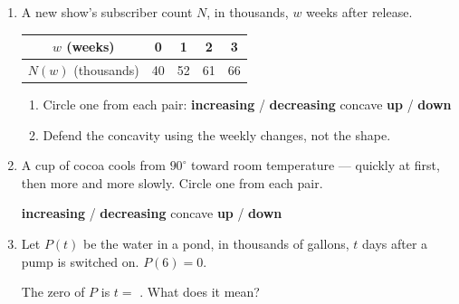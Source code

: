 \documentclass[10pt]{article}
\begin{document}

\vspace{0.12in}

\begin{enumerate}[itemsep=12pt]

\item A new show's subscriber count $N$, in thousands, $w$ weeks after release.

\smallskip
\renewcommand{\arraystretch}{1.4}
\begin{tabular}{|c|c|c|c|c|}
\hline
$w$ (weeks) & 0 & 1 & 2 & 3 \\
\hline
$N(w)$ (thousands) & 40 & 52 & 61 & 66 \\
\hline
\end{tabular}
\smallskip

\begin{enumerate}[label=(\alph*), itemsep=6pt]
  \item Circle one from each pair: \quad
        \textbf{increasing} / \textbf{decreasing} \qquad
        concave \textbf{up} / \textbf{down}
  \item Defend the concavity using the weekly changes, not the shape.

        \vspace{0.05in}
\end{enumerate}

\item A cup of cocoa cools from $90^\circ$ toward room temperature --- quickly
      at first, then more and more slowly. Circle one from each pair.

\vspace{0.05in}
\textbf{increasing} / \textbf{decreasing} \qquad concave \textbf{up} / \textbf{down}

\item Let $P(t)$ be the water in a pond, in thousands of gallons, $t$ days
      after a pump is switched on. $P(6) = 0$.

\vspace{0.05in}
The zero of $P$ is $t = $ \blank{1.6cm}. What does it mean?

\vspace{0.05in}
\writeline

\end{enumerate}
\end{document}
